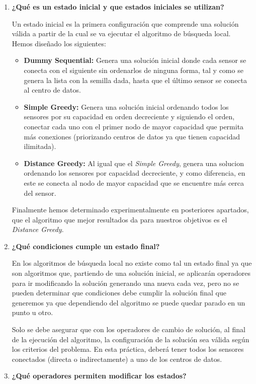 \documentclass{article}
\begin{document}
\begin{enumerate}
  \item \textbf{¿Qué es un estado inicial y que estados iniciales se utilizan?}\par
  Un estado inicial es la primera configuración que comprende una solución válida a partir de la cual se va ejecutar el algoritmo de búsqueda local. Hemos diseñado los siguientes:
   \begin{itemize}
    \item \textbf{Dummy Sequential:} Genera una solución inicial donde cada sensor se conecta con el siguiente sin ordenarlos de ninguna forma, tal y como se genera la lista con la semilla dada, hasta que el último sensor se conecta al centro de datos.
    \item \textbf{Simple Greedy:} Genera una solución inicial ordenando todos los sensores por su capacidad en orden decreciente y siguiendo el orden, conectar cada uno con el primer nodo de mayor capacidad que permita más conexiones (priorizando centros de datos ya que tienen capacidad ilimitada).
    \item \textbf{Distance Greedy:} Al igual que el \textit{Simple Greedy}, genera una solucion ordenando los sensores por capacidad decreciente, y como diferencia, en este se conecta al nodo de mayor capacidad que se encuentre más cerca del sensor.
  \end{itemize}
  Finalmente hemos determinado experimentalmente en posteriores apartados, que el algoritmo que mejor resultados da para nuestros objetivos es el \textit{Distance Greedy}.

  \item \textbf{¿Qué condiciones cumple un estado final?}\par
  En los algoritmos de búsqueda local no existe como tal un estado final ya que son algoritmos que, partiendo de una solución inicial, se aplicarán operadores para ir modificando la solución generando una nueva cada vez, pero no se pueden determinar que condiciones debe cumplir la solución final que generemos ya que dependiendo del algoritmo se puede quedar parado en un punto u otro.\par
  Solo se debe asegurar que con los operadores de cambio de solución, al final de la ejecución del algoritmo, la configuración de la solución sea válida según los criterios del problema. En esta práctica, deberá tener todos los sensores conectados (directa o indirectamente) a uno de los centros de datos.

  \item \textbf{¿Qué operadores permiten modificar los estados?}


\end{enumerate}
\end{document}
